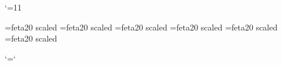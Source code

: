 %
%
%
%
%
\immediate{}%

\edef\catcodeat{\the\catcode`\@}\catcode`\@=11
\catcodesmusic


\font\fetaeleven=feta20 scaled \magstephalf
\font\fetathirteen=feta20 scaled 
\font\fetasixteen=feta20 scaled 
\font\fetatwenty=feta20 scaled 
\font\fetatwentyfour=feta20 scaled 
\font\fetatwentynine=feta20 scaled 

\let\fetanorfont\fetatwenty
\def\fetachar{\fetafont\char}   


\def\writ@ka{\pl@base\raise\y@i\llap{\fetachar\n@v\kern\accshift}}
\def\set@ka{\let\@Ti=\writ@ka}

\def\thdsh#1{\set@ka \n@v30 \check@staff \inhgetn@i#1\relax\expandafter\@Ti\fi}
\def\thsh#1{\set@ka \n@v20 \check@staff \inhgetn@i#1\relax\expandafter\@Ti\fi}
\def\thna#1{\set@ka \n@v32 \check@staff \inhgetn@i#1\relax\expandafter\@Ti\fi}
\def\thfl#1{\set@ka \n@v37 \check@staff \inhgetn@i#1\relax\expandafter\@Ti\fi}
\def\thdfl#1{\set@ka \n@v47 \check@staff \inhgetn@i#1\relax\expandafter\@Ti\fi}

\let\fetafont\fetanorfont

\endcatcodesmusic
\catcode`\@=\catcodeat
\endinput
